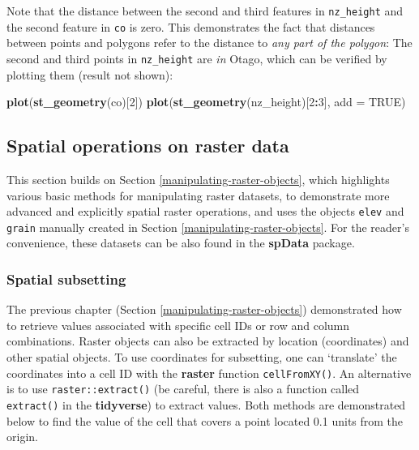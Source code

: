 \documentclass[]{krantz}
\newenvironment{Shaded}{\begin{snugshade}}{\end{snugshade}}
\newcommand{\DataTypeTok}[1]{\textcolor[rgb]{0.27,0.27,0.27}{#1}}
\newcommand{\DecValTok}[1]{\textcolor[rgb]{0.06,0.06,0.06}{#1}}
\newcommand{\KeywordTok}[1]{\textcolor[rgb]{0.27,0.27,0.27}{\textbf{#1}}}
\newcommand{\NormalTok}[1]{#1}
\newcommand{\OperatorTok}[1]{\textcolor[rgb]{0.43,0.43,0.43}{\textbf{#1}}}
\newcommand{\OtherTok}[1]{\textcolor[rgb]{0.37,0.37,0.37}{#1}}
\begin{document}
Note that the distance between the second and third features in \texttt{nz\_height} and the second feature in \texttt{co} is zero.
This demonstrates the fact that distances between points and polygons refer to the distance to \emph{any part of the polygon}:
The second and third points in \texttt{nz\_height} are \emph{in} Otago, which can be verified by plotting them (result not shown):

\begin{Shaded}
\begin{Highlighting}[]
\KeywordTok{plot}\NormalTok{(}\KeywordTok{st_geometry}\NormalTok{(co)[}\DecValTok{2}\NormalTok{])}
\KeywordTok{plot}\NormalTok{(}\KeywordTok{st_geometry}\NormalTok{(nz_height)[}\DecValTok{2}\OperatorTok{:}\DecValTok{3}\NormalTok{], }\DataTypeTok{add =} \OtherTok{TRUE}\NormalTok{)}
\end{Highlighting}
\end{Shaded}

\hypertarget{spatial-ras}{%
\subsection{Spatial operations on raster data}\label{spatial-ras}}

This section builds on Section \ref{manipulating-raster-objects}, which highlights various basic methods for manipulating raster datasets, to demonstrate more advanced and explicitly spatial raster operations, and uses the objects \texttt{elev} and \texttt{grain} manually created in Section \ref{manipulating-raster-objects}.
For the reader's convenience, these datasets can be also found in the \textbf{spData} package.

\hypertarget{spatial-raster-subsetting}{%
\subsubsection{Spatial subsetting}\label{spatial-raster-subsetting}}

The previous chapter (Section \ref{manipulating-raster-objects}) demonstrated how to retrieve values associated with specific cell IDs or row and column combinations.
Raster objects can also be extracted by location (coordinates) and other spatial objects.
To use coordinates for subsetting, one can `translate' the coordinates into a cell ID with the \textbf{raster} function \texttt{cellFromXY()}.
An alternative is to use \texttt{raster::extract()} (be careful, there is also a function called \texttt{extract()} in the \textbf{tidyverse}) to extract values.
Both methods are demonstrated below to find the value of the cell that covers a point located 0.1 units from the origin.
\end{document}
